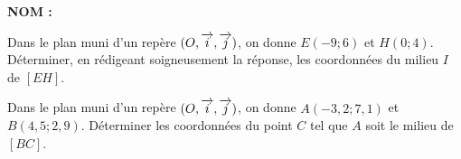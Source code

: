 \documentclass[a4paper,11pt,DIV10]{scrartcl}
\begin{document}
\noindent\textbf{NOM : }


\begin{exercice}
Dans le plan muni d'un repère $(O,\overrightarrow{i},\overrightarrow{j})$, on donne $E(-9;6)$ et
$H(0;4)$. Déterminer, en rédigeant soigneusement la réponse,
les coordonnées du milieu $I$ de $[EH]$.
\vfill
\end{exercice}

\begin{exercice}[2 points]
Dans le plan muni d'un repère $(O,\overrightarrow{i},\overrightarrow{j})$, on donne $A(-3,2 ; 7,1)$ et $B(4,5 ; 2,9)$. Déterminer les coordonnées du
point $C$ tel que $A$ soit le milieu de $[BC]$.
\end{exercice}
\vfill
\end{document}
